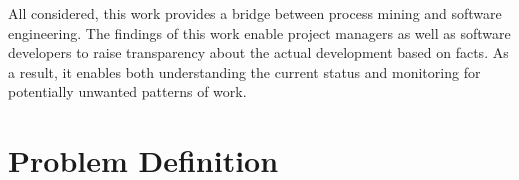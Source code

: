 All considered, this work provides a bridge between process mining and software engineering. The findings of this work enable project managers as well as software developers to raise transparency about the actual development based on facts. As a result, it enables both understanding the current status and monitoring for potentially unwanted patterns of work.



\section{Problem Definition}
\label{sec:problem-definition}



